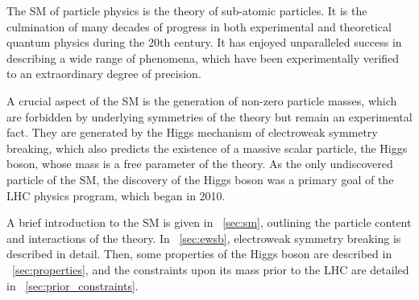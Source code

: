 
The \ac{SM} of particle physics is the theory of sub-atomic particles.
It is the culmination of many decades of progress in both experimental and theoretical
quantum physics during the 20th century. It has enjoyed unparalleled success in describing 
a wide range of phenomena, which have been experimentally verified to an extraordinary 
degree of precision.

A crucial aspect of the \ac{SM} is the generation of non-zero particle masses, which are 
forbidden by underlying symmetries of the theory but remain an experimental fact. 
They are generated by 
the Higgs mechanism of electroweak symmetry breaking, which also predicts the existence of 
a massive scalar particle, the Higgs boson, whose mass is a free parameter of the theory. 
As the only undiscovered particle of the \ac{SM}, the discovery of the Higgs boson was 
a primary goal of the LHC physics program, which began in 2010.

A brief introduction to the \ac{SM} is given in \Section~\ref{sec:sm}, outlining the 
particle content and interactions of the theory. In \Section~\ref{sec:ewsb}, electroweak 
symmetry breaking is described in detail. Then, some properties of the Higgs boson are 
described in \Section~\ref{sec:properties}, and the constraints upon its mass prior to the 
\acs{LHC} are detailed in \Section~\ref{sec:prior_constraints}.
